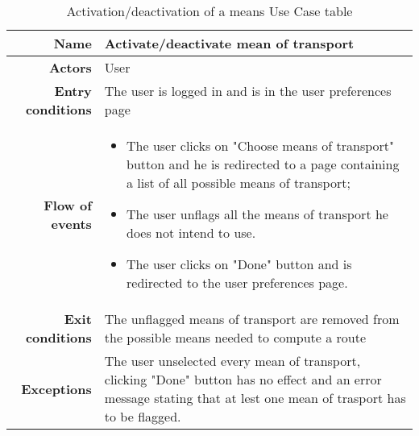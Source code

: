 \begin{table}[htp]
\begin{tabular}{r|p{7cm}}
\bf\large Name&\bf\large Activate/deactivate mean of transport\\
\hline
\hline
\bf Actors&User\\
\hline
\bf Entry conditions&The user is logged in and is in the user preferences page\\
\hline
\bf Flow of events&
\begin{itemize}
\item The user clicks on "Choose means of transport" button and he is redirected to a page containing a list of all possible means of transport;
\item  The user unflags all the means of transport he does not intend to use.
\item  The user clicks on "Done" button and is redirected to the user preferences page.
\end{itemize}
\\
\hline
\bf Exit conditions&The unflagged means of transport are removed from the possible means needed to compute a route\\
\hline
\bf Exceptions&The user unselected every mean of transport, clicking "Done" button has no effect and an error message stating that at lest one mean of trasport has to be flagged.
\\
\hline

\end{tabular}
\caption{Activation/deactivation of a means Use Case table} \label{tab:activatedeactivatemean}
\end{table}